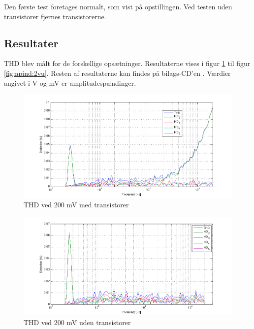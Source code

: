Den første test foretages normalt, som vist på opstillingen. Ved testen uden transistorer fjernes transistorerne.	

\subsection*{Resultater}

THD blev målt for de forskellige opsætninger. Resultaterne vises i figur \ref{fig:apind:200mvm} til figur \ref{fig:apind:2vu}. Resten af resultaterne kan findes på bilags-CD'en \cite{indgangsvaelger-maalinng}%
. Værdier angivet i V og mV er amplitudespændinger.

\begin{figure}[h]
\centering
\includegraphics[width=\textwidth]{maalerapporter/indgangsvaelger/maalinger/opa/mic-200mv-opa-muxudgang-thd.png}
\caption{THD ved 200 mV med transistorer}
\label{fig:apind:200mvm}
\end{figure}

\begin{figure}[h]
\centering
\includegraphics[width=\textwidth]{maalerapporter/indgangsvaelger/maalinger/opa/mic-200mv-opa-muxudgang-uden-transistor thd.png}
\caption{THD ved 200 mV uden transistorer}
\label{fig:apind:200mvu}
\end{figure}

